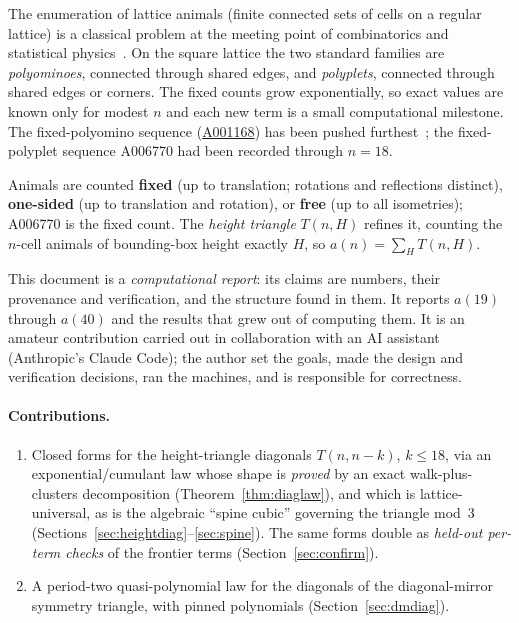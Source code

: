 \documentclass[11pt]{article}
\begin{document}
The enumeration of lattice animals (finite connected sets of cells on a
regular lattice) is a classical problem at the meeting point of combinatorics and
statistical physics~\cite{klarner,jensen2001}. On the square lattice the two
standard families are \emph{polyominoes}, connected through shared edges, and
\emph{polyplets}, connected through shared edges or corners. The fixed counts
grow exponentially, so exact values are known only for modest $n$ and each new
term is a small computational milestone. The fixed-polyomino sequence
(\href{https://oeis.org/A001168}{A001168}) has been pushed
furthest~\cite{redelmeier,jensen2003,barequet}; the fixed-polyplet sequence
A006770 had been recorded through $n=18$.

Animals are counted \textbf{fixed} (up to translation; rotations and
reflections distinct), \textbf{one-sided} (up to translation and rotation),
or \textbf{free} (up to all isometries); A006770 is the fixed count. The
\emph{height triangle} $T(n,H)$ refines it, counting the $n$-cell animals of
bounding-box height exactly $H$, so $a(n)=\sum_H T(n,H)$.

This document is a \emph{computational report}: its claims are numbers,
their provenance and verification, and the structure found in
them. It reports $a(19)$ through $a(40)$ and the results that grew out of
computing them. It is an amateur contribution carried out in collaboration
with an AI assistant (Anthropic's Claude Code); the author set the goals,
made the design and verification decisions, ran the machines, and is
responsible for correctness.

\paragraph{Contributions.}
\begin{enumerate}
  \item Closed forms for the height-triangle diagonals $T(n,n-k)$,
        $k\le18$, via an exponential/cumulant law whose shape is
        \emph{proved} by an exact walk-plus-clusters decomposition
        (Theorem~\ref{thm:diaglaw}), and which is lattice-universal, as is
        the algebraic ``spine cubic'' governing the triangle mod~3
        (Sections~\ref{sec:heightdiag}--\ref{sec:spine}). The same
        forms double as \emph{held-out per-term checks} of the frontier
        terms (Section~\ref{sec:confirm}).
  \item A period-two quasi-polynomial law for the diagonals of the
        diagonal-mirror symmetry triangle, with pinned polynomials
        (Section~\ref{sec:dmdiag}).
\end{enumerate}
\end{document}
